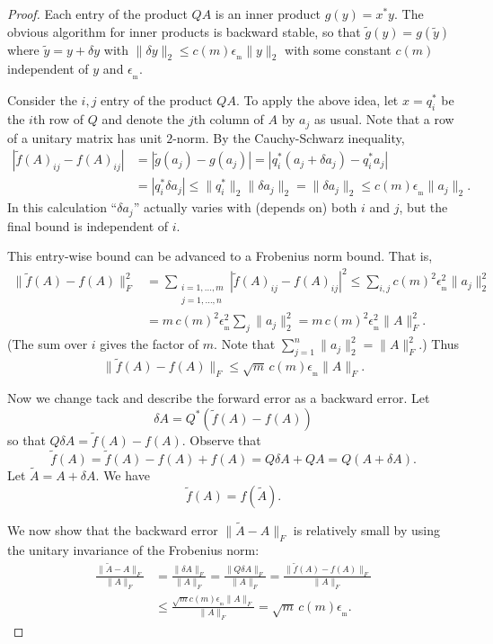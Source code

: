 \documentclass[12pt]{amsart}
\newcommand{\eps}{\epsilon}
\newcommand{\ema}{\emach}
\newcommand{\emach}{\eps_{\!_{\text{m}}}}
\begin{document}
\begin{proof}
Each entry of the product $QA$ is an inner product $g(y)=x^*y$.  The obvious algorithm for inner products is backward stable, so that $\tilde g(y) = g(\tilde y)$ where $\tilde y = y + \delta y$ with $\|\delta y\|_2 \le c(m) \ema \|y\|_2$ with some constant $c(m)$ independent of $y$ and $\ema$.

Consider the $i,j$ entry of the product $QA$.  To apply the above idea, let $x = q_i^*$ be the $i$th row of $Q$ and denote the $j$th column of $A$ by $a_j$ as usual.  Note that a row of a unitary matrix has unit $2$-norm.  By the Cauchy-Schwarz inequality,
\begin{align*}
|\tilde f(A)_{ij} - f(A)_{ij}| &= |\tilde g(a_j) - g(a_j)| = |q_i^* (a_j + \delta a_j) - q_i^* a_j|\\
  &= |q_i^* \delta a_j| \le \|q_i^*\|_2 \|\delta a_j\|_2 = \|\delta a_j\|_2 \le c(m) \ema \|a_j\|_2.
\end{align*}
In this calculation ``$\delta a_j$'' actually varies with (depends on) both $i$ and $j$, but the final bound is independent of $i$.

This entry-wise bound can be advanced to a Frobenius norm bound.  That is,
\begin{align*}
\|\tilde f(A) - f(A)\|_F^2 &= \sum_{\begin{smallmatrix} i=1,\dots,m \\ j=1,\dots,n \end{smallmatrix}}|\tilde f(A)_{ij} - f(A)_{ij}|^2 \le \sum_{i,j} c(m)^2 \ema^2 \|a_j\|_2^2 \\
   &= m\, c(m)^2 \ema^2 \sum_{j} \|a_j\|_2^2 = m\, c(m)^2 \ema^2 \|A\|_F^2.
\end{align*}
(The sum over $i$ gives the factor of $m$.  Note that $\sum_{j=1}^n \|a_j\|_2^2 = \|A\|_F^2$.)  Thus
    $$\|\tilde f(A) - f(A)\|_F \le \sqrt{m}\, c(m) \ema \|A\|_F.$$

Now we change tack and describe the forward error as a backward error.  Let
    $$\delta A = Q^*(\tilde f(A) - f(A))$$
so that $Q \delta A = \tilde f(A) - f(A)$.  Observe that
    $$\tilde f(A) = \tilde f(A) - f(A) + f(A) = Q \delta A + QA = Q (A+\delta A).$$
Let $\tilde A=A+\delta A$.  We have
    $$\tilde f(A) = f(\tilde A).$$

We now show that the backward error $\|\tilde A - A\|_F$ is relatively small by using the unitary invariance of the Frobenius norm:
\begin{align*}
\frac{\|\tilde A - A\|_F}{\|A\|_F} &= \frac{\|\delta A\|_F}{\|A\|_F} = \frac{\|Q\delta A\|_F}{\|A\|_F} = \frac{\|\tilde f(A) - f(A)\|_F}{\|A\|_F} \\
   &\le \frac{\sqrt{m} c(m) \ema \|A\|_F}{\|A\|_F} = \sqrt{m}\, c(m) \ema.
\end{align*}
\end{proof}
\end{document}
